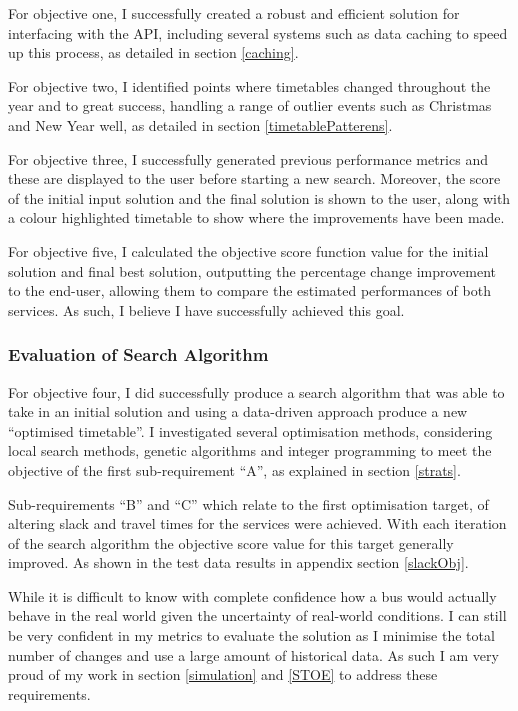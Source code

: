 \documentclass{article}
\begin{document}
\par
For objective one, I successfully created a robust and efficient solution for interfacing with the API, including several systems such as data caching to speed up this process, as detailed in section \ref{caching}.

\par
For objective two, I identified points where timetables changed throughout the year and to great success, handling a range of outlier events such as Christmas and New Year well, as detailed in section \ref{timetablePatterens}.

\par
For objective three, I successfully generated previous performance metrics and these are displayed to the user before starting a new search. Moreover, the score of the initial input solution and the final solution is shown to the user, along with a colour highlighted timetable to show where the improvements have been made. 

\par 
For objective five, I calculated the objective score function value for the initial solution and final best solution, outputting the percentage change improvement to the end-user, allowing them to compare the estimated performances of both services. As such, I believe I have successfully achieved this goal.  



\subsubsection{Evaluation of Search Algorithm}
For objective four, I did successfully produce a search algorithm that was able to take in an initial solution and using a data-driven approach produce a new ``optimised timetable''.  I investigated several optimisation methods, considering local search methods, genetic algorithms and integer programming to meet the objective of the first sub-requirement ``A'', as explained in section \ref{strats}.

\par 
Sub-requirements ``B'' and ``C'' which relate to the first optimisation target, of altering slack and travel times for the services were achieved.  With each iteration of the search algorithm the objective score value for this target generally improved. As shown in the test data results in appendix section \ref{slackObj}.


\par 
While it is difficult to know with complete confidence how a bus would actually behave in the real world given the uncertainty of real-world conditions. I can still be very confident in my metrics to evaluate the solution as I minimise the total number of changes and use a large amount of historical data. As such I am very proud of my work in section \ref{simulation} and \ref{STOE} to address these requirements. 
\end{document}

